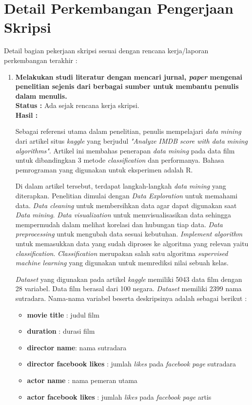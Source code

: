 \documentclass[a4paper,twoside]{article}
\begin{document}
\section{Detail Perkembangan Pengerjaan Skripsi}
Detail bagian pekerjaan skripsi sesuai dengan rencana kerja/laporan perkembangan terakhir :
	\begin{enumerate}
		\item \textbf{Melakukan studi literatur dengan mencari jurnal, \textit{paper} mengenai penelitian sejenis dari berbagai sumber untuk membantu penulis dalam menulis.}\\
		{\bf Status :} Ada sejak rencana kerja skripsi.\\
		{\bf Hasil : } 
		
Sebagai referensi utama dalam penelitian, penulis mempelajari \textit{data mining} dari artikel situs \textit{kaggle} yang berjudul \textit{"Analyze IMDB score with data mining algorithms"}. Artikel ini membahas penerapan \textit{data mining} pada data film  untuk dibandingkan 3 metode \textit{classification}	dan performanya. Bahasa pemrograman yang digunakan untuk eksperimen adalah R.

Di dalam artikel tersebut, terdapat langkah-langkah \textit{data mining} yang diterapkan. Penelitian dimulai dengan \textit{Data Exploration} untuk memahami data. \textit{Data cleaning} untuk membersihkan data agar dapat digunakan saat \textit{Data mining}. \textit{Data visualization} untuk memvisualisasikan data sehingga mempermudah dalam melihat korelasi dan hubungan tiap data. \textit{Data preprocessing} untuk mengubah data sesuai kebutuhan. \textit{Implement algorithm} untuk memasukkan data yang sudah diproses ke algoritma yang relevan yaitu \textit{classification}. \textit{Classification} merupakan salah satu algoritma \textit{supervised machine learning} yang digunakan untuk memrediksi nilai sebuah kelas.

\textit{Dataset} yang digunakan pada artikel \textit{kaggle} memiliki 5043 data film dengan 28 variabel. Data film berasal dari 100 negara. \textit{Dataset} memiliki 2399 nama sutradara. Nama-nama variabel beserta deskripsinya adalah sebagai berikut :

\begin{itemize}
\item 	\textbf{movie \textunderscore title} : judul film
\item   \textbf{duration}	 : durasi film
\item	\textbf{director \textunderscore name}: nama sutradara 
\item	\textbf{director \textunderscore facebook \textunderscore likes} : jumlah \textit{likes} pada \textit{facebook page} sutradara
\item	\textbf{actor  \textunderscore name} : nama pemeran utama 
\item	\textbf{actor  \textunderscore facebook \textunderscore likes} : jumlah \textit{likes} pada \textit{facebook page} artis 


\end{itemize}
\end{enumerate}
\end{document}
